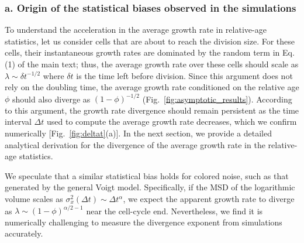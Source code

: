 \documentclass[aps, prl, longbibliography, linenumbers, superscriptaddress]{revtex4-2}
\begin{document}
\subsubsection{a. Origin of the statistical biases observed in the simulations}
To understand the acceleration in the average growth rate in relative-age statistics, let us consider cells that are about to reach the division size. For these cells, their instantaneous growth rates are dominated by the random term in Eq. (1) of the main text; thus, the average growth rate over these cells should scale as $\lambda\sim \delta t^{-1/2}$ where $\delta t$ is the time left before division. Since this argument does not rely on the doubling time, the average growth rate conditioned on the relative age $\phi$ should also diverge as $(1-\phi)^{-1/2}$ (Fig.~\ref{fig:asymptotic_results}). According to this argument, the growth rate divergence should remain persistent as the time interval $\Delta t$ used to compute the average growth rate decreases, which we confirm numerically [Fig.~\ref{fig:deltat}(a)]. In the next section, we provide a detailed analytical derivation for the divergence of the average growth rate in the relative-age statistics.
	
We speculate that a similar statistical bias holds for colored noise, such as that generated by the general Voigt model. Specifically, if the MSD of the logarithmic volume scales as $\sigma_x^2(\Delta t) \sim \Delta t^{\alpha}$, we expect the apparent growth rate to diverge as $\lambda \sim (1-\phi)^{\alpha/2-1}$ near the cell-cycle end. Nevertheless, we find it is numerically challenging to measure the divergence exponent from simulations accurately.
\end{document}
